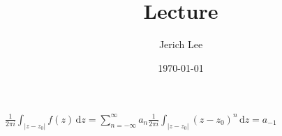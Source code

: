 \documentclass[12pt]{article}
\title{Lecture}
\author{Jerich Lee}
\date{\today}
\theoremstyle{definition} %
\theoremstyle{plain} %
\begin{document}
\maketitle
$\frac{1}{2\pi i}\int_{\left\vert z-z_0 \right\vert }^{}f(z)  \,\mathrm{d}z = \sum_{n=-\infty }^{\infty} a_{n} \frac{1}{2\pi i}\int_{\left\vert z - z_{0}  \right\vert }^{}(z-z_0)^{n}  \,\mathrm{d}z = a_{-1}$ 
\end{document}
